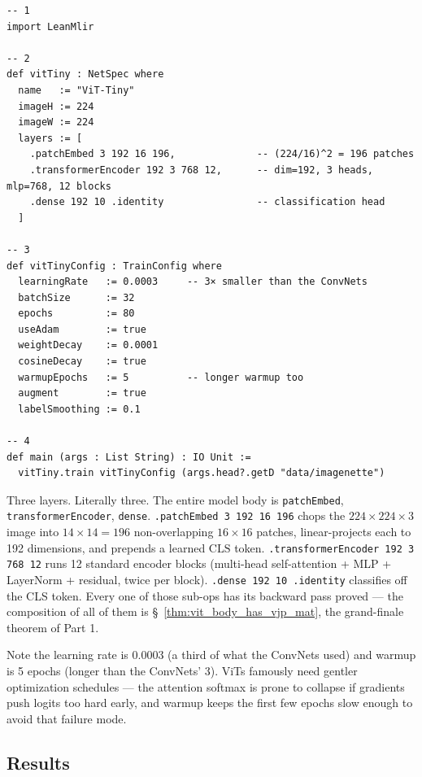 \begin{verbatim}
-- 1
import LeanMlir

-- 2
def vitTiny : NetSpec where
  name   := "ViT-Tiny"
  imageH := 224
  imageW := 224
  layers := [
    .patchEmbed 3 192 16 196,              -- (224/16)^2 = 196 patches
    .transformerEncoder 192 3 768 12,      -- dim=192, 3 heads, mlp=768, 12 blocks
    .dense 192 10 .identity                -- classification head
  ]

-- 3
def vitTinyConfig : TrainConfig where
  learningRate   := 0.0003     -- 3× smaller than the ConvNets
  batchSize      := 32
  epochs         := 80
  useAdam        := true
  weightDecay    := 0.0001
  cosineDecay    := true
  warmupEpochs   := 5          -- longer warmup too
  augment        := true
  labelSmoothing := 0.1

-- 4
def main (args : List String) : IO Unit :=
  vitTiny.train vitTinyConfig (args.head?.getD "data/imagenette")
\end{verbatim}

Three layers. Literally three. The entire model body is
\texttt{patchEmbed}, \texttt{transformerEncoder}, \texttt{dense}.
\texttt{.patchEmbed 3 192 16 196} chops the $224 \times 224 \times 3$
image into $14 \times 14 = 196$ non-overlapping $16 \times 16$
patches, linear-projects each to 192 dimensions, and prepends a
learned $\mathrm{CLS}$ token. \texttt{.transformerEncoder 192 3 768
12} runs 12 standard encoder blocks (multi-head self-attention + MLP
+ LayerNorm + residual, twice per block). \texttt{.dense 192 10
.identity} classifies off the CLS token. Every one of those sub-ops
has its backward pass proved --- the composition of all of them is
\S~\ref{thm:vit_body_has_vjp_mat}, the grand-finale theorem of Part
1.

Note the learning rate is 0.0003 (a third of what the ConvNets
used) and warmup is 5 epochs (longer than the ConvNets' 3). ViTs
famously need gentler optimization schedules --- the attention
softmax is prone to collapse if gradients push logits too hard
early, and warmup keeps the first few epochs slow enough to avoid
that failure mode.

\subsection*{Results}

